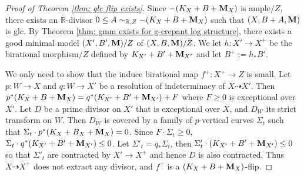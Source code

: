 \documentclass[11pt]{amsart}
\numberwithin{equation}{section}
\newcommand{\Mm}{{\bf{M}}}
\theoremstyle{definition}
\theoremstyle{definition}
\theoremstyle{definition}
\begin{document}
    \begin{proof}[Proof of Theorem \ref{thm: glc flip exists}]
      Since $-(K_X+B+\Mm_X)$ is ample$/Z$, there exists an $\mathbb
      R$-divisor $0\leq A\sim_{\mathbb R,Z}-(K_X+B+\Mm_X)$ such that
      $(X,B+A,\Mm)$ is glc. By Theorem \ref{thm: gmm exists for
      g-crepant log structure}, there exists a good minimal model
      $(X',B',\Mm)/Z$ of $(X,B,\Mm)/Z$. We let $h: X'\rightarrow X^+$
      be the birational morphism$/Z$ defined by $K_{X'}+B'+\Mm_{X'}$
      and let $B^+:=h_*B'$.

      We only need to show that the induce birational map $f^+:
      X^+\rightarrow Z$ is small. Let $p:W\to X$ and $q:W\to X'$ be a
      resolution of indeterminacy of $X\dashrightarrow X'$. Then
      $p^*(K_X+B+\Mm_X)=q^*(K_{X'}+B'+\Mm_{X'})+F$ where $F\geq 0$ is
      exceptional over $X'$. Let $D$ be a prime divisor on $X'$ that
      is exceptional over $X$, and $D_W$ its strict transform on $W$.
      Then $D_W$ is covered by a family of $p$-vertical curves
      $\Sigma _t$ such that $\Sigma_t\cdot p^*(K_X+B_X+\Mm_X)=0$.
      Since $F\cdot\Sigma_t\geq 0$, $\Sigma_t\cdot
      q^*(K_{X'}+B'+\Mm_{X'})\leq 0$.
      Let $\Sigma'_t=q_*\Sigma _t$, then $\Sigma ' _t\cdot
      (K_{X'}+B'+\Mm_{X'})\leq 0$ so that $\Sigma '_t$ are contracted
      by $X'\to X^+$ and hence $D$ is also contracted. Thus
      $X\dashrightarrow X^+$ does not extract any divisor, and $f^+$
      is a $(K_X+B+\Mm_X)$-flip.
    \end{proof}
\end{document}
